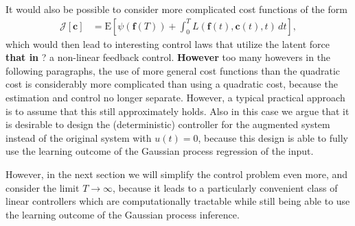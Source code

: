 \documentclass[journal]{IEEEtran}
\newcommand{\mauricio}[1]{{\color{blue}#1}}
\begin{document}
It would also be possible to consider more complicated cost functions of the form
%
\begin{equation}
\begin{split}
  \mathcal{J}[\mathbf{c}] &= \mathrm{E} \left[ \psi(\mathbf{f}(T))
   + \int_0^T L(\mathbf{f}(t),\mathbf{c}(t),t) \, dt \right],
\end{split}
\label{eq:quadcost1}
\end{equation}
%
which would then lead to interesting control laws that utilize the latent force \mauricio{\textbf{that in} ?} a
non-linear feedback control. \mauricio{\textbf{However} too many howevers in the following paragraphs}, the use of more general cost functions than the quadratic cost is considerably more complicated than using a quadratic cost, because the estimation and control no longer separate. \mauricio{However}, a typical practical approach is to assume that this still approximately holds. Also in this case we argue that it is desirable to design the (deterministic) controller for the augmented system instead of the original system with $u(t) = 0$, because this design is able to fully use the learning outcome of the Gaussian process regression of the input.

\mauricio{However}, in the next section we will simplify the control problem even more, and consider the limit $T \to \infty$, because it leads to a particularly convenient class of linear controllers which are computationally tractable while still being able to use the learning outcome of the Gaussian process inference.
\end{document}
